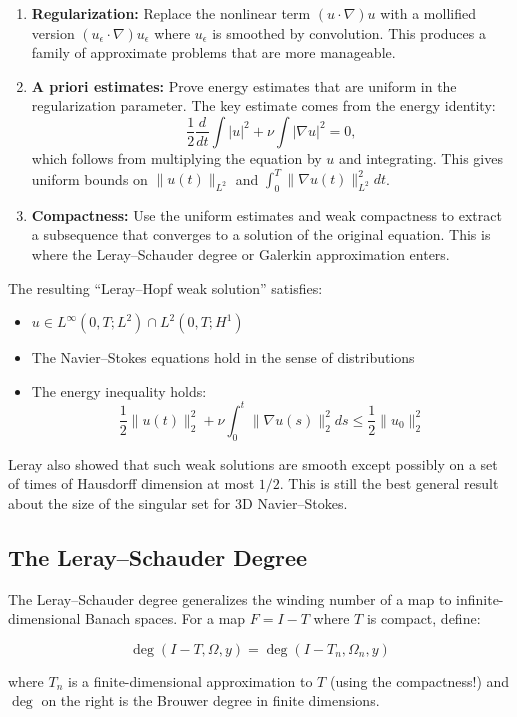 \begin{enumerate}
\item \textbf{Regularization:} Replace the nonlinear term $(u \cdot \nabla) u$ with a mollified version $(u_\epsilon \cdot \nabla) u_\epsilon$ where $u_\epsilon$ is smoothed by convolution. This produces a family of approximate problems that are more manageable.
\item \textbf{A priori estimates:} Prove energy estimates that are uniform in the regularization parameter. The key estimate comes from the energy identity:
\[
\frac{1}{2}\frac{d}{dt} \int |u|^2 + \nu \int |\nabla u|^2 = 0,
\]
which follows from multiplying the equation by $u$ and integrating. This gives uniform bounds on $\|u(t)\|_{L^2}$ and $\int_0^T \|\nabla u(t)\|_{L^2}^2 dt$.
\item \textbf{Compactness:} Use the uniform estimates and weak compactness to extract a subsequence that converges to a solution of the original equation. This is where the Leray--Schauder degree or Galerkin approximation enters.
\end{enumerate}

The resulting ``Leray--Hopf weak solution'' satisfies:
\begin{itemize}
\item $u \in L^\infty(0,T; L^2) \cap L^2(0,T; H^1)$
\item The Navier--Stokes equations hold in the sense of distributions
\item The energy inequality holds:
\[
\frac{1}{2}\|u(t)\|_2^2 + \nu \int_0^t \|\nabla u(s)\|_2^2 ds \leq \frac{1}{2}\|u_0\|_2^2
\]
\end{itemize}

Leray also showed that such weak solutions are smooth except possibly on a set of times of Hausdorff dimension at most $1/2$. This is still the best general result about the size of the singular set for 3D Navier--Stokes.

\subsection{The Leray--Schauder Degree}

The Leray--Schauder degree generalizes the winding number of a map to infinite-dimensional Banach spaces. For a map $F = I - T$ where $T$ is compact, define:

\[
\deg(I - T, \Omega, y) = \deg(I - T_n, \Omega_n, y)
\]

where $T_n$ is a finite-dimensional approximation to $T$ (using the compactness!) and $\deg$ on the right is the Brouwer degree in finite dimensions.

